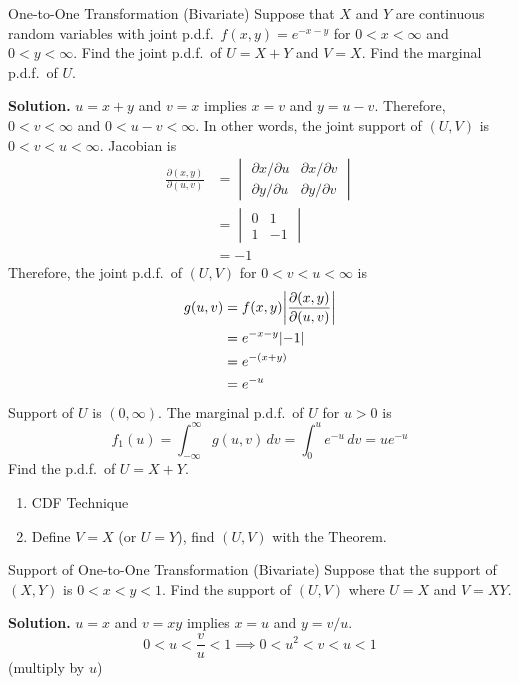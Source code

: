 \begin{Example}{One-to-One Transformation (Bivariate)}{}
    Suppose that $ X $ and $ Y $ are continuous random variables with
    joint p.d.f.\ $ f(x,y)=e^{-x-y} $ for $ 0<x<\infty $
    and $ 0<y<\infty $. Find the joint p.d.f.\ of
    $ U=X+Y $ and $ V=X $. Find the marginal p.d.f.\ of $ U $.

    \textbf{Solution.} $ u=x+y $ and $ v=x $ implies
    $ x=v $ and $ y=u-v $. Therefore, $ 0<v<\infty $
    and $ 0<u-v<\infty $. In other words,
    the joint support of $ (U,V) $ is
    $ 0<v<u<\infty $. Jacobian is
    \begin{align*}
        \frac{\partial(x,y)}{\partial(u,v)}
         & =\begin{vmatrix}
            \partial x/\partial u & \partial x/\partial v \\
            \partial y/\partial u & \partial y/\partial v
        \end{vmatrix} \\
         & =\begin{vmatrix}
            0 & 1  \\
            1 & -1
        \end{vmatrix} \\
         & =-1
    \end{align*}
    Therefore, the joint p.d.f.\ of $ (U,V) $ for $ 0<v<u<\infty $ is
    \begin{align*}
        g(u,v)
         & =f(x,y)\abs*{\frac{\partial(x,y)}{\partial(u,v)}} \\
         & =e^{-x-y}\abs{-1}                                 \\
         & =e^{-(x+y)}                                       \\
         & =e^{-u}
    \end{align*}
    Support of $ U $ is $ (0,\infty) $.
    The marginal p.d.f.\ of $ U $ for $ u>0 $ is
    \[ f_1(u)=\int_{-\infty}^{\infty} g(u,v)\, d{v}=
        \int_{0}^{u} e^{-u}\, d{v}=u e^{-u} \]
    Find the p.d.f.\ of $ U=X+Y $.
    \begin{enumerate}
        \item CDF Technique
        \item Define $ V=X $ (or $ U=Y $),
              find $ (U,V) $ with the Theorem.
    \end{enumerate}
\end{Example}
\begin{Example}{Support of One-to-One Transformation (Bivariate)}{}
    Suppose that the support of $ (X,Y) $ is
    $ 0<x<y<1 $. Find the support of $ (U,V) $
    where $ U=X $ and $ V=XY $.

    \textbf{Solution.} $ u=x $ and $ v=xy $
    implies $ x=u $ and $ y=v/u $.
    \[ 0<u<\frac{v}{u} <1\implies 0<u^2<v<u<1 \]
    (multiply by $ u $)
\end{Example}
